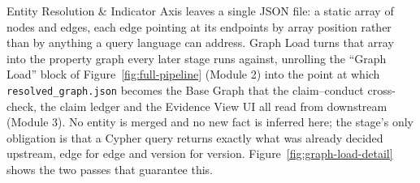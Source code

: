 \documentclass[fontsize=12pt,oneside,headings=small]{scrreprt}
\begin{document}
Entity Resolution \& Indicator Axis leaves a single JSON file: a static array of nodes and edges, each edge pointing at its endpoints by array position rather than by anything a query language can address. Graph Load turns that array into the property graph every later stage runs against, unrolling the ``Graph Load'' block of Figure~\ref{fig:full-pipeline} (Module 2) into the point at which \texttt{resolved\_graph.json} becomes the Base Graph that the claim--conduct cross-check, the claim ledger and the Evidence View UI all read from downstream (Module 3). No entity is merged and no new fact is inferred here; the stage's only obligation is that a Cypher query returns exactly what was already decided upstream, edge for edge and version for version. Figure~\ref{fig:graph-load-detail} shows the two passes that guarantee this.
\end{document}
